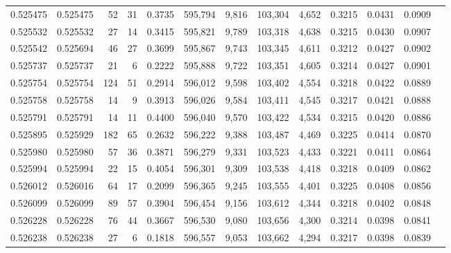 \begin{tabular}{rrrrrrrrrrrrr}
0.525475 & 0.525475 &    52 &    31 &                                     0.3735 & 595,794 &   9,816 & 103,304 &   4,652 & 0.3215 & 0.0431 & 0.0909 \\
0.525532 & 0.525532 &    27 &    14 &                                     0.3415 & 595,821 &   9,789 & 103,318 &   4,638 & 0.3215 & 0.0430 & 0.0907 \\
0.525542 & 0.525694 &    46 &    27 &                                     0.3699 & 595,867 &   9,743 & 103,345 &   4,611 & 0.3212 & 0.0427 & 0.0902 \\
0.525737 & 0.525737 &    21 &     6 &                                     0.2222 & 595,888 &   9,722 & 103,351 &   4,605 & 0.3214 & 0.0427 & 0.0901 \\
0.525754 & 0.525754 &   124 &    51 &                                     0.2914 & 596,012 &   9,598 & 103,402 &   4,554 & 0.3218 & 0.0422 & 0.0889 \\
0.525758 & 0.525758 &    14 &     9 &                                     0.3913 & 596,026 &   9,584 & 103,411 &   4,545 & 0.3217 & 0.0421 & 0.0888 \\
0.525791 & 0.525791 &    14 &    11 &                                     0.4400 & 596,040 &   9,570 & 103,422 &   4,534 & 0.3215 & 0.0420 & 0.0886 \\
0.525895 & 0.525929 &   182 &    65 &                                     0.2632 & 596,222 &   9,388 & 103,487 &   4,469 & 0.3225 & 0.0414 & 0.0870 \\
0.525980 & 0.525980 &    57 &    36 &                                     0.3871 & 596,279 &   9,331 & 103,523 &   4,433 & 0.3221 & 0.0411 & 0.0864 \\
0.525994 & 0.525994 &    22 &    15 &                                     0.4054 & 596,301 &   9,309 & 103,538 &   4,418 & 0.3218 & 0.0409 & 0.0862 \\
0.526012 & 0.526016 &    64 &    17 &                                     0.2099 & 596,365 &   9,245 & 103,555 &   4,401 & 0.3225 & 0.0408 & 0.0856 \\
0.526099 & 0.526099 &    89 &    57 &                                     0.3904 & 596,454 &   9,156 & 103,612 &   4,344 & 0.3218 & 0.0402 & 0.0848 \\
0.526228 & 0.526228 &    76 &    44 &                                     0.3667 & 596,530 &   9,080 & 103,656 &   4,300 & 0.3214 & 0.0398 & 0.0841 \\
0.526238 & 0.526238 &    27 &     6 &                                     0.1818 & 596,557 &   9,053 & 103,662 &   4,294 & 0.3217 & 0.0398 & 0.0839 \\

\end{tabular}
